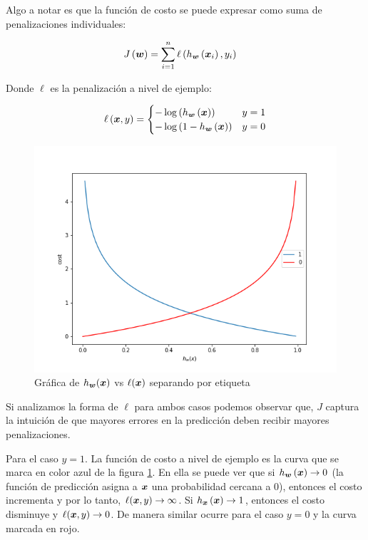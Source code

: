 Algo a notar es que la función de costo se puede expresar como suma de
penalizaciones individuales:

\begin{align}
    J\left( \boldsymbol{w} \right) &= \sum_{i=1}^{n} \ell\left( h_{\boldsymbol{w}}\left( \boldsymbol{x}_{i}\right), y_{i}\right)
\end{align}

Donde $\ell$ es la penalización a nivel de ejemplo:

\begin{align}
    \ell\left( \boldsymbol{x}, y \right) =
    \begin{cases}
        - \log\left( h_{\boldsymbol{w}}\left( \boldsymbol{x} \right) \right) & y = 1 \\
        - \log\left(1 - h_{\boldsymbol{w}}\left( \boldsymbol{x} \right) \right) & y = 0
    \end{cases}
\end{align}

\begin{figure}
    \centering
    \includegraphics[scale=0.5]{figures/logistic_regression_loss.png}
    \caption{Gráfica de $h_{\boldsymbol{w}}(\boldsymbol{x})$ vs $\ell(\boldsymbol{x})$ separando
    por etiqueta}
    \label{fig:lgr_loss}
\end{figure}

Si analizamos la forma de $\ell$ para ambos casos podemos observar que, $J$
captura la intuición de que mayores errores en la predicción deben recibir
mayores penalizaciones.

Para el caso $y = 1$. La función de costo a nivel de ejemplo es la curva que se
marca en color azul de la figura \ref{fig:lgr_loss}. En ella se puede ver que si
$h_{\boldsymbol{w}}\left( \boldsymbol{x} \right) \rightarrow 0$ (la función de predicción
asigna a $\boldsymbol{x}$ una probabilidad cercana a $0$), entonces el costo
incrementa y por lo tanto, $\ell(\boldsymbol{x}, y) \rightarrow \infty$. Si
$h_{\boldsymbol{x}}\left( \boldsymbol{x} \right) \rightarrow 1$, entonces el costo disminuye
y $\ell(\boldsymbol{x}, y) \rightarrow 0$. De manera similar ocurre para el caso $y =
0$ y la curva marcada en rojo.

